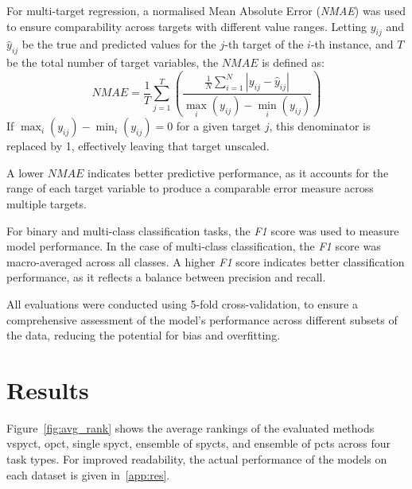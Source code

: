 \documentclass[3p,review,authoryear]{elsarticle}
\begin{document}
For multi-target regression, a normalised Mean Absolute Error (\textit{NMAE}) was used to ensure comparability across targets with different value ranges. Letting \(y_{ij}\) and \(\hat{y}_{ij}\) be the true and predicted values for the \(j\)-th target of the \(i\)-th instance, and \(T\) be the total number of target variables, the \(\textit{NMAE}\) is defined as:
\[
\textit{NMAE} = \frac{1}{T} \sum_{j=1}^{T} \left( \frac{\frac{1}{N} \sum_{i=1}^{N} | y_{ij} - \hat{y}_{ij} |}{\max_i(y_{ij}) - \min_i(y_{ij})} \right)
\]
If \(\max_i(y_{ij}) - \min_i(y_{ij}) = 0\) for a given target \(j\), this denominator is replaced by 1, effectively leaving that target unscaled.

A lower \(\textit{NMAE}\) indicates better predictive performance, as it accounts for the range of each target variable to produce a comparable error measure across multiple targets.


For binary and multi-class classification tasks, the \textit{F1} score was used to measure model performance.
In the case of multi-class classification, the \textit{F1} score was macro-averaged across all classes.
A higher \textit{F1} score indicates better classification performance, as it reflects a balance between precision and recall.

All evaluations were conducted using 5-fold cross-validation, to ensure a comprehensive assessment of the model's performance across different subsets of the data, reducing the potential for bias and overfitting.


\section{Results}

Figure~\ref{fig:avg_rank} shows the average rankings of the evaluated methods \gls{vspyct}, \gls{opct}, single \gls{spyct}, ensemble of \glspl{spyct}, and ensemble of \glspl{pct} across four task types.
For improved readability, the actual performance of the models on each dataset is given in~\ref{app:res}.
\end{document}
